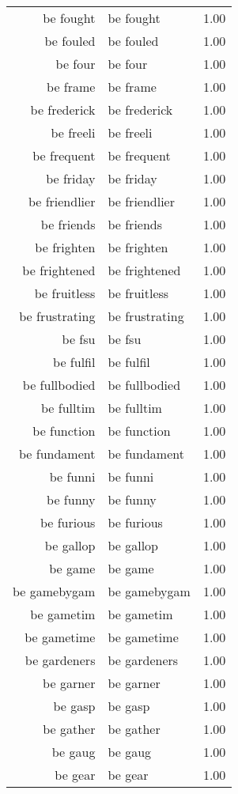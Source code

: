 \begin{table}[ht]
\begin{tabular}{rlr}
  be fought & be fought & 1.00 \\ 
  be fouled & be fouled & 1.00 \\ 
  be four & be four & 1.00 \\ 
  be frame & be frame & 1.00 \\ 
  be frederick & be frederick & 1.00 \\ 
  be freeli & be freeli & 1.00 \\ 
  be frequent & be frequent & 1.00 \\ 
  be friday & be friday & 1.00 \\ 
  be friendlier & be friendlier & 1.00 \\ 
  be friends & be friends & 1.00 \\ 
  be frighten & be frighten & 1.00 \\ 
  be frightened & be frightened & 1.00 \\ 
  be fruitless & be fruitless & 1.00 \\ 
  be frustrating & be frustrating & 1.00 \\ 
  be fsu & be fsu & 1.00 \\ 
  be fulfil & be fulfil & 1.00 \\ 
  be fullbodied & be fullbodied & 1.00 \\ 
  be fulltim & be fulltim & 1.00 \\ 
  be function & be function & 1.00 \\ 
  be fundament & be fundament & 1.00 \\ 
  be funni & be funni & 1.00 \\ 
  be funny & be funny & 1.00 \\ 
  be furious & be furious & 1.00 \\ 
  be gallop & be gallop & 1.00 \\ 
  be game & be game & 1.00 \\ 
  be gamebygam & be gamebygam & 1.00 \\ 
  be gametim & be gametim & 1.00 \\ 
  be gametime & be gametime & 1.00 \\ 
  be gardeners & be gardeners & 1.00 \\ 
  be garner & be garner & 1.00 \\ 
  be gasp & be gasp & 1.00 \\ 
  be gather & be gather & 1.00 \\ 
  be gaug & be gaug & 1.00 \\ 
  be gear & be gear & 1.00 \\ 

\end{tabular}
\end{table}
